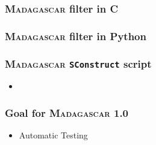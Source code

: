 \begin{frame}
\frametitle{\textsc{Madagascar} filter in C}
\MadLogo

\begin{code}[c]
\centering
\hfill
\begin{minipage}{0.9\textwidth}
\lstset{language=c,showstringspaces=false}

\end{minipage}
\hfill
\end{code}

\end{frame}

\begin{frame}
\frametitle{\textsc{Madagascar} filter in Python}
\MadLogo

\begin{code}[python]
\centering
\hfill
\begin{minipage}{0.9\textwidth}

\end{minipage}
\hfill
\end{code}

\end{frame}

\begin{frame}
\frametitle{\textsc{Madagascar} \texttt{SConstruct} script}
\MadLogo

\begin{code}[python]
\centering
\hfill
\begin{minipage}{0.9\textwidth}

\end{minipage}
\hfill
\end{code}

\vfill

\begin{code}[bash]

\end{code}

\vfill
\begin{itemize}
\item  {}
\end{itemize}
\end{frame}

\begin{frame}
\MadLogo
\frametitle{Goal for \textsc{Madagascar} 1.0}
\begin{itemize}
\item Automatic Testing
\end{itemize}
\end{frame}

